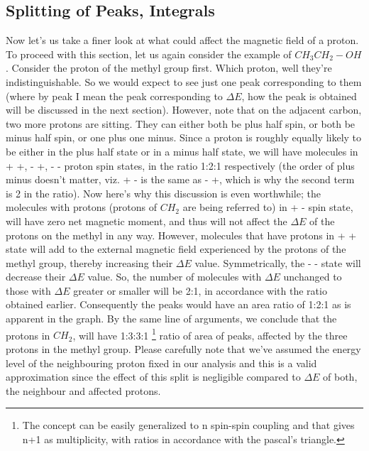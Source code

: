 	\subsection{Splitting of Peaks, Integrals}
		Now let's us take a finer look at what could affect the magnetic field of a proton. To proceed with this section, let us again consider the example of $CH_3CH_2-OH$. Consider the proton of the methyl group first. Which proton, well they're indistinguishable. So we would expect to see just one peak corresponding to them (where by peak I mean the peak corresponding to $\Delta E$, how the peak is obtained will be discussed in the next section). However, note that on the adjacent carbon, two more protons are sitting. They can either both be plus half spin, or both be minus half spin, or one plus one minus. Since a proton is roughly equally likely to be either in the plus half state or in a minus half state, we will have molecules in + +, - +, - - proton spin states, in the ratio 1:2:1 respectively (the order of plus minus doesn't matter, viz. + - is the same as - +, which is why the second term is 2 in the ratio). Now here's why this discussion is even worthwhile; the molecules with protons (protons of $CH_2$ are being referred to) in + - spin state, will have zero net magnetic moment, and thus will not affect the $\Delta E$ of the protons on the methyl in any way. However, molecules that have protons in + + state will add to the external magnetic field experienced by the protons of the methyl group, thereby increasing their $\Delta E$ value. Symmetrically, the - - state will decrease their $\Delta E$ value. So, the number of molecules with $\Delta E$ unchanged to those with $\Delta E$ greater or smaller will be 2:1, in accordance with the ratio obtained earlier. Consequently the peaks would have an area ratio of 1:2:1 as is apparent in the graph. By the same line of arguments, we conclude that the protons in $CH_2$, will have 1:3:3:1 \footnote{The concept can be easily generalized to n spin-spin coupling and that gives n+1 as multiplicity, with ratios in accordance with the pascal's triangle.} ratio of area of peaks, affected by the three protons in the methyl group. Please carefully note that we've assumed the energy level of the neighbouring proton fixed in our analysis and this is a valid approximation since the effect of this split is negligible compared to $\Delta E$ of both, the neighbour and affected protons.

